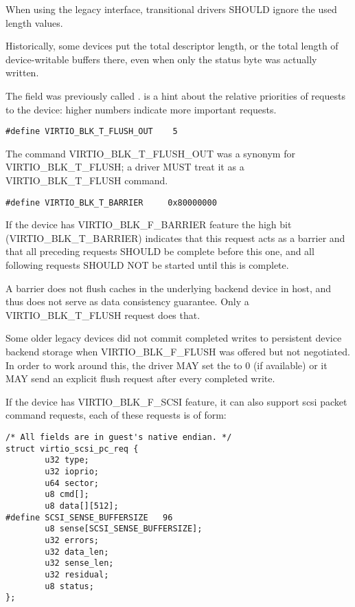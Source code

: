 When using the legacy interface, transitional drivers
SHOULD ignore the used length values.
\begin{note}
Historically, some devices put the total descriptor length,
or the total length of device-writable buffers there,
even when only the status byte was actually written.
\end{note}

The  field was previously called .  
is a hint about the relative priorities of requests to the device:
higher numbers indicate more important requests.

\begin{lstlisting}
#define VIRTIO_BLK_T_FLUSH_OUT    5
\end{lstlisting}

The command VIRTIO_BLK_T_FLUSH_OUT was a synonym for VIRTIO_BLK_T_FLUSH;
a driver MUST treat it as a VIRTIO_BLK_T_FLUSH command.

\begin{lstlisting}
#define VIRTIO_BLK_T_BARRIER     0x80000000
\end{lstlisting}

If the device has VIRTIO_BLK_F_BARRIER
feature the high bit (VIRTIO_BLK_T_BARRIER) indicates that this
request acts as a barrier and that all preceding requests SHOULD be
complete before this one, and all following requests SHOULD NOT be
started until this is complete.

\begin{note} A barrier does not flush
caches in the underlying backend device in host, and thus does not
serve as data consistency guarantee.  Only a VIRTIO_BLK_T_FLUSH request
does that.
\end{note}

Some older legacy devices did not commit completed writes to persistent
device backend storage when VIRTIO_BLK_F_FLUSH was offered but not
negotiated.  In order to work around this, the driver MAY set the
 to 0 (if available) or it MAY send an explicit flush
request after every completed write.

If the device has VIRTIO_BLK_F_SCSI feature, it can also support
scsi packet command requests, each of these requests is of form:

\begin{lstlisting}
/* All fields are in guest's native endian. */
struct virtio_scsi_pc_req {
        u32 type;
        u32 ioprio;
        u64 sector;
        u8 cmd[];
        u8 data[][512];
#define SCSI_SENSE_BUFFERSIZE   96
        u8 sense[SCSI_SENSE_BUFFERSIZE];
        u32 errors;
        u32 data_len;
        u32 sense_len;
        u32 residual;
        u8 status;
};
\end{lstlisting}

